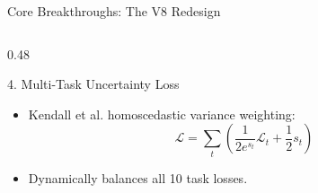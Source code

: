 \documentclass[aspectratio=169, 10pt]{beamer}
\begin{document}
\begin{frame}{Core Breakthroughs: The V8 Redesign}
\begin{columns}[T]
\begin{column}{0.48\textwidth}
      \begin{block}{4. Multi-Task Uncertainty Loss}
        \begin{itemize}
          \item Kendall et al. homoscedastic variance weighting:
          \[
            \mathcal{L} = \sum_{t} \left(\frac{1}{2 e^{s_t}} \mathcal{L}_t + \frac{1}{2} s_t\right)
          \]
          \item Dynamically balances all 10 task losses.
        \end{itemize}
      \end{block}
    \end{column}
  \end{columns}
\end{frame}

\end{document}
